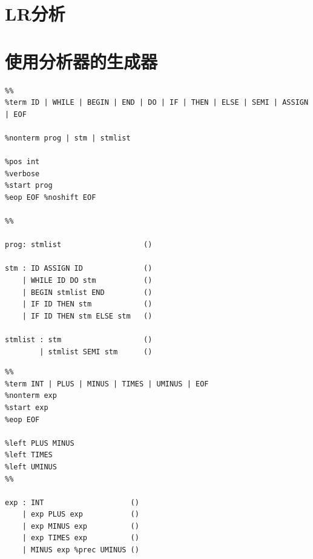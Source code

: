 \documentclass[cn,11pt,chinese]{elegantbook}
\newenvironment{code}{\captionsetup{type=listing}}{}
\begin{document}

\section{LR分析}

\section{使用分析器的生成器}

\begin{code}
\label{grammar:3-31}
\begin{verbatim}
%%
%term ID | WHILE | BEGIN | END | DO | IF | THEN | ELSE | SEMI | ASSIGN | EOF

%nonterm prog | stm | stmlist

%pos int
%verbose
%start prog
%eop EOF %noshift EOF

%%

prog: stmlist                   ()

stm : ID ASSIGN ID              ()
    | WHILE ID DO stm           ()
    | BEGIN stmlist END         ()
    | IF ID THEN stm            ()
    | IF ID THEN stm ELSE stm   ()

stmlist : stm                   ()
        | stmlist SEMI stm      ()
\end{verbatim}
\end{code}

\begin{code}
\label{grammar:3-35}
\begin{verbatim}
%%
%term INT | PLUS | MINUS | TIMES | UMINUS | EOF
%nonterm exp
%start exp
%eop EOF

%left PLUS MINUS
%left TIMES
%left UMINUS
%%

exp : INT                    ()
    | exp PLUS exp           ()
    | exp MINUS exp          ()
    | exp TIMES exp          ()
    | MINUS exp %prec UMINUS ()
\end{verbatim}
\end{code}
\end{document}

